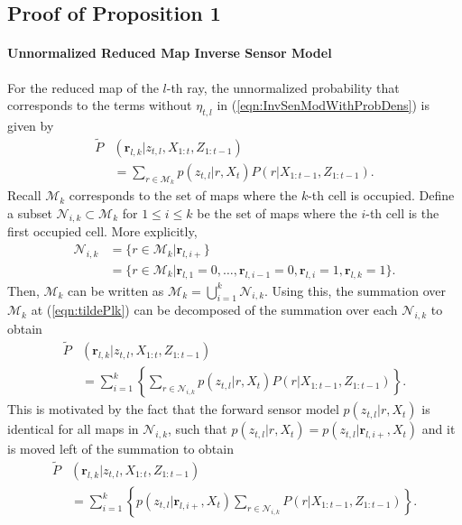 \documentclass[letterpaper, 10pt, conference]{ieeeconf}
\newcommand{\braces}[1]{\ensuremath{\left\{ #1 \right\}}}
\newcommand{\refeqn}[1]{(\ref{eqn:#1})}
\begin{document}
\begin{appendix}
\label{append}


\subsection{Proof of Proposition 1}

\paragraph{Unnormalized Reduced Map Inverse Sensor Model}
For the reduced map of the $l$-th ray, the unnormalized probability that corresponds to the terms without $\eta_{t,l}$ in \refeqn{InvSenModWithProbDens} is given by
\begin{align}
\tilde P&(\mathbf{r}_{l,k}|z_{t,l},X_{1:t},Z_{1:t-1})\nonumber\\
& = \sum_{r\in\mathcal{M}_{k}} p(z_{t,l}|r,X_t) P(r|X_{1:t-1},Z_{1:t-1}).\label{eqn:tildePlk}
\end{align}
Recall $\mathcal{M}_k$ corresponds to the set of maps where the $k$-th cell is occupied. Define a subset $\mathcal{N}_{i,k}\subset \mathcal{M}_k$ for $1\leq i\leq k$ be the set of maps where the $i$-th cell is the first occupied cell. More explicitly, 
\begin{align*}
\mathcal{N}_{i,k} & = \{ r\in\mathcal{M}_k| \mathbf{r}_{l,i+}\}\\
&= \{ r\in\mathcal{M}_k| \mathbf{r}_{l,1}=0,\ldots, \mathbf{r}_{l,i-1}=0, \mathbf{r}_{l,i}=1,
\mathbf{r}_{l,k}=1\}.
\end{align*}
Then, $\mathcal{M}_k$ can be written as $\mathcal{M}_k =\bigcup_{i=1}^{k} \mathcal{N}_{i,k}$. Using this, the summation over $\mathcal{M}_k$ at \refeqn{tildePlk} can be decomposed of the summation over each $\mathcal{N}_{i,k}$ to obtain
\begin{align*}
\tilde P&(\mathbf{r}_{l,k}|z_{t,l},X_{1:t},Z_{1:t-1})\nonumber\\
& = \sum_{i=1}^k\braces{\sum_{r\in\mathcal{N}_{i,k}} p(z_{t,l}|r,X_t) P(r|X_{1:t-1},Z_{1:t-1})}.
\end{align*}
This is motivated by the fact that the forward sensor model $p(z_{t,l}|r,X_t)$ is identical for all maps in $\mathcal{N}_{i,k}$, such that $p(z_{t,l}|r,X_t)=p(z_{t,l}|\mathbf{r}_{l,i+},X_t)$ and it is moved left of the summation to obtain
\begin{align}
\tilde P&(\mathbf{r}_{l,k}|z_{t,l},X_{1:t},Z_{1:t-1})\nonumber\\
& = \sum_{i=1}^k \braces{p(z_{t,l}|\mathbf{r}_{l,i+},X_t) \sum_{r\in\mathcal{N}_{i,k}} P(r|X_{1:t-1},Z_{1:t-1})}.\label{eqn:tildePlk0}

\end{align}
\end{appendix}
\end{document}

